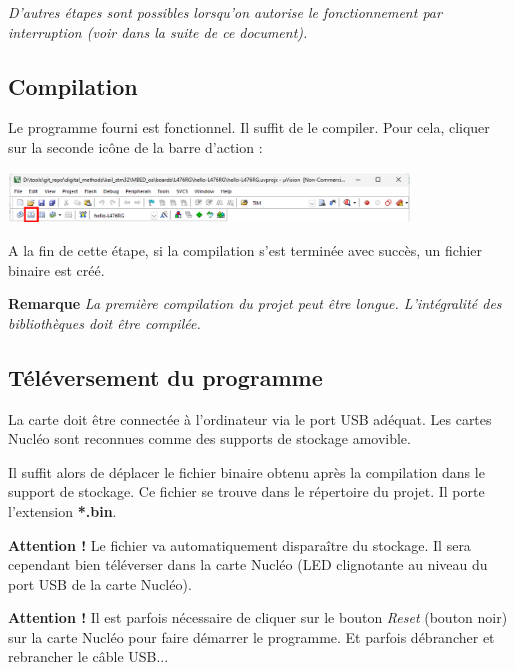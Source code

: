 \documentclass[a4paper,11pt,titlepage]{article} %
\begin{document}
\textit{D'autres étapes sont possibles lorsqu'on autorise le fonctionnement par interruption (voir dans la suite de ce document).}


\subsection{Compilation}

Le programme fourni est fonctionnel. Il suffit de le compiler. Pour cela, cliquer sur la seconde icône de la barre d'action :

\begin{center}
	\includegraphics[width=0.8\textwidth]{images/uvision_compile.png}
\end{center}

A la fin de cette étape, si la compilation s'est terminée avec succès, un fichier binaire est créé.

\bigskip

\textbf{Remarque} \textit{La première compilation du projet peut être longue. L'intégralité des bibliothèques doit être compilée.}


\subsection{Téléversement du programme}

La carte doit être connectée à l'ordinateur via le port USB adéquat. Les cartes Nucléo sont reconnues comme des supports de stockage amovible.

Il suffit alors de déplacer le fichier binaire obtenu après la compilation dans le support de stockage. Ce fichier se trouve dans le répertoire du projet. Il porte l'extension \textbf{*.bin}.

\bigskip

\textbf{Attention !} Le fichier va automatiquement disparaître du stockage. Il sera cependant bien téléverser dans la carte Nucléo (LED clignotante au niveau du port USB de la carte Nucléo).

\bigskip

\textbf{Attention !} Il est parfois nécessaire de cliquer sur le bouton \textit{Reset} (bouton noir) sur la carte Nucléo pour faire démarrer le programme. Et parfois débrancher et rebrancher le câble USB...


\bigskip
\end{document}
